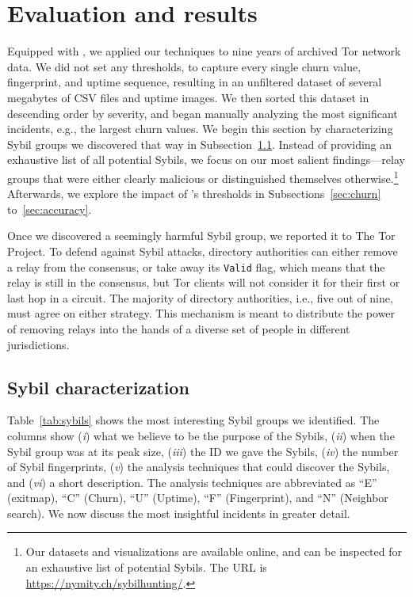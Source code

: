 \section{Evaluation and results}
\label{sec:results}
Equipped with \sys, we applied our techniques to nine years of archived Tor
network data.  We did not set any thresholds, to capture every single churn
value, fingerprint, and uptime sequence, resulting in an unfiltered dataset of
several megabytes of CSV files and uptime images.  We then sorted this dataset
in descending order by severity, and began manually analyzing the most
significant incidents, e.g., the largest churn values.  We begin this section
by characterizing Sybil groups we discovered that way in
Subsection~\ref{sec:sybil_groups}.  Instead of providing an exhaustive list of
all potential Sybils, we focus on our most salient findings---relay groups that
were either clearly malicious or distinguished themselves
otherwise.\footnote{Our datasets and visualizations are available online, and
can be inspected for an exhaustive list of potential Sybils.  The URL is
\url{https://nymity.ch/sybilhunting/}.}  Afterwards, we explore the impact of
\sys's thresholds in Subsections~\ref{sec:churn} to~\ref{sec:accuracy}.

Once we discovered a seemingly harmful Sybil group, we reported it to The Tor
Project.  To defend against Sybil attacks, directory authorities can either
remove a relay from the consensus, or take away its \texttt{Valid} flag, which
means that the relay is still in the consensus, but Tor clients will not
consider it for their first or last hop in a circuit.  The majority of directory
authorities, i.e., five out of nine, must agree on either strategy.  This
mechanism is meant to distribute the power of removing relays into the hands of
a diverse set of people in different jurisdictions.

\subsection{Sybil characterization}
\label{sec:sybil_groups}
Table~\ref{tab:sybils} shows the most interesting Sybil groups we identified.
The columns show (\emph{i}) what we believe to be the purpose of the Sybils,
(\emph{ii}) when the Sybil group was at its peak size, (\emph{iii}) the ID we
gave the Sybils, (\emph{iv}) the number of Sybil fingerprints, (\emph{v}) the
analysis techniques that could discover the Sybils, and (\emph{vi}) a short
description.  The analysis techniques are abbreviated as ``E'' (exitmap), ``C''
(Churn), ``U'' (Uptime), ``F'' (Fingerprint), and ``N'' (Neighbor search).  We
now discuss the most insightful incidents in greater detail.

